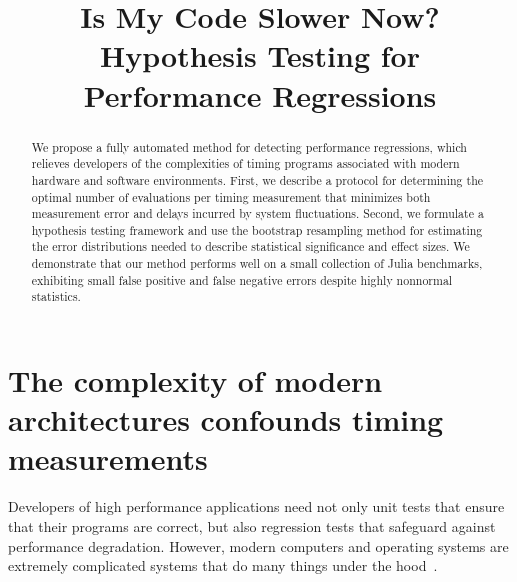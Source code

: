 \documentclass[conference]{IEEEtran}
\begin{document}
\newcommand{\TODO}[1]{\todo[inline]{#1}}
\newcommand{\TODOFIG}[1]{\missingfigure{#1}}

\title{Is My Code Slower Now? Hypothesis Testing for Performance Regressions}

\author{
}

\maketitle

\begin{abstract}
We propose a fully automated method for detecting performance regressions,
which relieves developers of the complexities of timing programs associated with
modern hardware and software environments.
First, we describe a protocol for determining the optimal number of evaluations
per timing measurement that minimizes both measurement error
and delays incurred by system fluctuations.
Second, we formulate a hypothesis testing framework and use the bootstrap
resampling method for estimating the error distributions needed to describe
statistical significance and effect sizes.
We demonstrate that our method performs well on a small collection of Julia benchmarks,
exhibiting small false positive and false negative errors despite highly nonnormal statistics.
\end{abstract}

\IEEEpeerreviewmaketitle

\section{The complexity of modern architectures confounds timing measurements}

Developers of high performance applications need not only unit tests that
ensure that their programs are correct, but also regression tests that safeguard
against performance degradation.
However, modern computers and operating systems are extremely complicated
systems that do many things under the hood~\cite{HP5e}.
\end{document}

